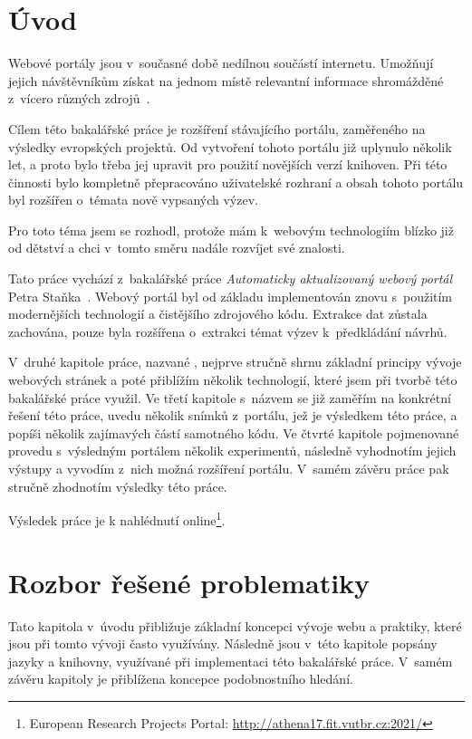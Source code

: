 \chapter{Úvod}
Webové portály jsou v~současné době nedílnou součástí internetu. Umožňují jejich návštěvníkům získat na jednom místě relevantní informace shromážděné z~vícero různých zdrojů~\cite{bib:portal-liferay}.

Cílem této bakalářské práce je rozšíření stávajícího portálu, zaměřeného na výsledky evropských projektů. Od vytvoření tohoto portálu již uplynulo několik let, a proto bylo třeba jej upravit pro použití novějších verzí knihoven. Při této činnosti bylo kompletně přepracováno uživatelské rozhraní a obsah tohoto portálu byl rozšířen o~témata nově vypsaných výzev.

Pro toto téma jsem se rozhodl, protože mám k~webovým technologiím blízko již od dětství a chci v~tomto směru nadále rozvíjet své znalosti.

Tato práce vychází z~bakalářské práce \emph{Automaticky aktualizovaný webový portál} Petra Staňka~\cite{bib:stanek}.
Webový portál byl od základu implementován znovu s~použitím modernějších technologií a čistějšího zdrojového kódu. Extrakce dat zůstala zachována, pouze byla rozšířena o~extrakci témat výzev k~předkládání návrhů.

V~druhé kapitole práce, nazvané , nejprve stručně shrnu základní principy vývoje webových stránek a poté přiblížím několik technologií, které jsem při tvorbě této bakalářské práce využil.
Ve třetí kapitole s~názvem  se již zaměřím na konkrétní řešení této práce, uvedu několik snímků z~portálu, jež je výsledkem této práce, a popíši několik zajímavých částí samotného kódu.
Ve čtvrté kapitole pojmenované  provedu s~výsledným portálem několik experimentů, následně vyhodnotím jejich výstupy a vyvodím z~nich možná rozšíření portálu.
V~samém závěru práce pak stručně zhodnotím výsledky této práce.

Výsledek práce je k nahlédnutí online\footnote{European Research Projects Portal: \url{http://athena17.fit.vutbr.cz:2021/}}.




\chapter{Rozbor řešené problematiky}
Tato kapitola v~úvodu přibližuje základní koncepci vývoje webu a praktiky, které jsou při tomto vývoji často využívány. Následně jsou v~této kapitole popsány jazyky a knihovny, využívané při implementaci této bakalářské práce. V~samém závěru kapitoly je přiblížena koncepce podobnostního hledání.



